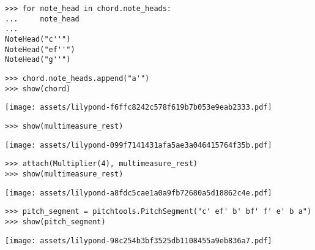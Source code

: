 \begin{comment}
<abjad>
for note_head in chord.note_heads:
    note_head

chord.note_heads.append("a'")
show(chord)
</abjad>
\end{comment}

\begin{abjadbookoutput}
\begin{singlespacing}
\vspace{-0.5\baselineskip}
\begin{lstlisting}
>>> for note_head in chord.note_heads:
...     note_head
...
NoteHead("c''")
NoteHead("ef''")
NoteHead("g''")
\end{lstlisting}
\begin{lstlisting}
>>> chord.note_heads.append("a'")
>>> show(chord)
\end{lstlisting}
\noindent\texttt{[image: assets/lilypond-f6ffc8242c578f619b7b053e9eab2333.pdf]}
\end{singlespacing}
\end{abjadbookoutput}

\begin{comment}
<abjad>
show(multimeasure_rest)
attach(Multiplier(4), multimeasure_rest)
show(multimeasure_rest)
</abjad>
\end{comment}

\begin{abjadbookoutput}
\begin{singlespacing}
\vspace{-0.5\baselineskip}
\begin{lstlisting}
>>> show(multimeasure_rest)
\end{lstlisting}
\noindent\texttt{[image: assets/lilypond-099f7141431afa5ae3a046415764f35b.pdf]}
\begin{lstlisting}
>>> attach(Multiplier(4), multimeasure_rest)
>>> show(multimeasure_rest)
\end{lstlisting}
\noindent\texttt{[image: assets/lilypond-a8fdc5cae1a0a9fb72680a5d18862c4e.pdf]}
\end{singlespacing}
\end{abjadbookoutput}

\begin{comment}
<abjad>
pitch_segment = pitchtools.PitchSegment("c' ef' b' bf' f' e' b a")
show(pitch_segment)
</abjad>
\end{comment}

\begin{abjadbookoutput}
\begin{singlespacing}
\vspace{-0.5\baselineskip}
\begin{lstlisting}
>>> pitch_segment = pitchtools.PitchSegment("c' ef' b' bf' f' e' b a")
>>> show(pitch_segment)
\end{lstlisting}
\noindent\texttt{[image: assets/lilypond-98c254b3bf3525db1108455a9eb836a7.pdf]}
\end{singlespacing}
\end{abjadbookoutput}

